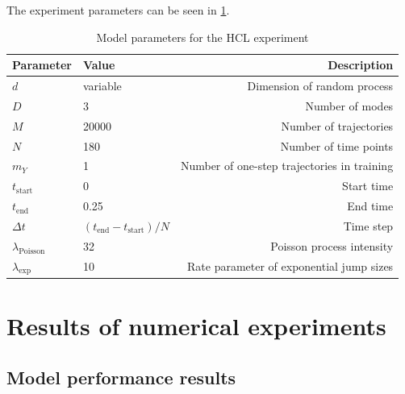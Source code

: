 \documentclass[11pt,reqno,a4paper]{amsart}
\theoremstyle{definition}
\numberwithin{equation}{section}
\DeclareMathOperator{\1}{\mathbbm{1}}
\begin{document}
The experiment parameters can be seen in \cref{tab:carmona_dim_params}.
\begin{table}[ht]
  \centering
  \caption{Model parameters for the HCL experiment}
  \label{tab:carmona_dim_params}
  \begin{tabular}{@{}llr@{}}
    \toprule
    Parameter                & Value                               & Description                                 \\
    \midrule
    $d$                      & variable                            & Dimension of random process                 \\
    $D$                      & 3                                   & Number of modes                             \\
    $M$                      & 20000                               & Number of trajectories                      \\
    $N$                      & 180                                 & Number of time points                       \\
    $m_Y$                    & 1                                   & Number of one-step trajectories in training \\
    $t_\text{start}$         & 0                                   & Start time                                  \\
    $t_\text{end}$           & 0.25                                & End time                                    \\
    $\Delta t$               & $(t_\text{end} - t_\text{start})/N$ & Time step                                   \\
    $\lambda_\text{Poisson}$ & 32                                  & Poisson process intensity                   \\
    $\lambda_\text{exp}$     & 10                                  & Rate parameter of exponential jump sizes    \\
    \bottomrule
  \end{tabular}
\end{table}


\section{Results of numerical experiments}\label{sec:results}
\subsection{Model performance results}
\end{document}
